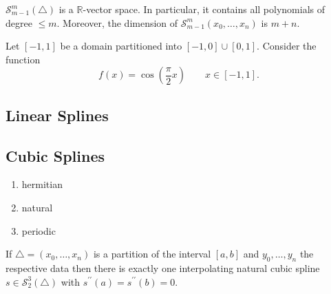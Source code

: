 \begin{theorem}
    \(\mathcal{S}_{m-1}^m(\triangle)\) is a \(\mathbb{R}\)-vector space. In particular, it contains all polynomials of degree \(\leq m\). Moreover, the dimension of \(\mathcal{S}_{m-1}^m (x_0, \ldots, x_n)\) is \(m + n\). 
\end{theorem}

\begin{example}
    Let \([-1, 1]\) be a domain partitioned into \([-1, 0] \cup [0, 1]\). Consider the function
    \begin{equation}
        f(x) = \cos \left( \frac{\pi}{2} x \right) \qquad x \in [-1, 1] \text{.}
    \end{equation}
\end{example}

\subsection{Linear Splines}

\subsection{Cubic Splines}

\begin{definition}
    \begin{enumerate}
        \item hermitian
        \item natural
        \item periodic
    \end{enumerate}
\end{definition}

\begin{theorem}
    If \(\triangle = (x_0, \ldots, x_n)\) is a partition of the interval \([a, b]\) and \(y_0, \ldots, y_n\) the respective data then there is exactly one interpolating natural cubic spline \(s \in \mathcal{S}_2^3(\triangle)\) with \(s^{\prime\prime} (a) = s^{\prime\prime}(b) = 0\).
\end{theorem}

